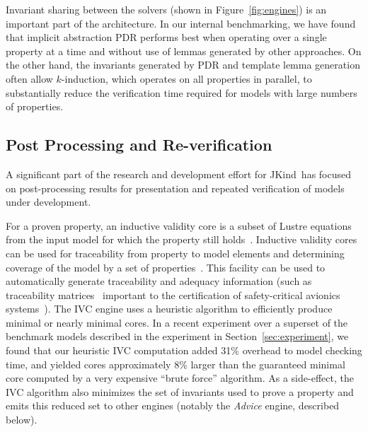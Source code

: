 \documentclass{llncs}
\newcommand{\jkind}{{\sc JKind}\xspace}
\newcommand{\lustre}{{\sc Lustre}\xspace}
\renewcommand{\paragraph}[1]{\vspace{5pt}\noindent {\bf #1}}
\begin{document}

Invariant sharing between the solvers (shown in Figure~\ref{fig:engines}) is an important part of the architecture.  In our internal benchmarking, we have found that implicit abstraction PDR performs best when operating over a single property at a time and without use of lemmas generated by other approaches.  On the other hand, the invariants generated by PDR and template lemma generation often allow $k$-induction, which operates on all properties in parallel, to substantially reduce the verification time required for models with large numbers of properties.  %

\subsection{Post Processing and Re-verification}

A significant part of the research and development effort for \jkind\ has focused on
post-processing results for presentation and repeated verification of models under development.


\paragraph{Inductive Validity Cores (IVC).} For a proven property, an inductive validity core is a subset of \lustre equations from the input model for which the property still
holds~\cite{ghassabani2016fse,Ghass17AllIVCs}.  Inductive validity cores can be used for traceability from property to model elements and determining coverage of the model by a set of properties~\cite{Ghass17Cov}.  This facility can be used to automatically generate traceability and adequacy information (such as traceability matrices~\cite{fifarek2017nfm} important to the certification of safety-critical avionics systems~\cite{DO178C}).
The IVC engine uses a heuristic algorithm to efficiently produce minimal or nearly minimal cores.   In a recent experiment over a superset of the benchmark models described in the experiment in Section~\ref{sec:experiment}, we found that our heuristic IVC computation added 31\% overhead to model checking time, and yielded cores approximately 8\% larger than the guaranteed minimal core computed by a very expensive ``brute force'' algorithm.  As a side-effect, the IVC algorithm also minimizes the set of invariants used to prove a property and emits this reduced set to other engines (notably the {\em Advice} engine, described below).
\end{document}
